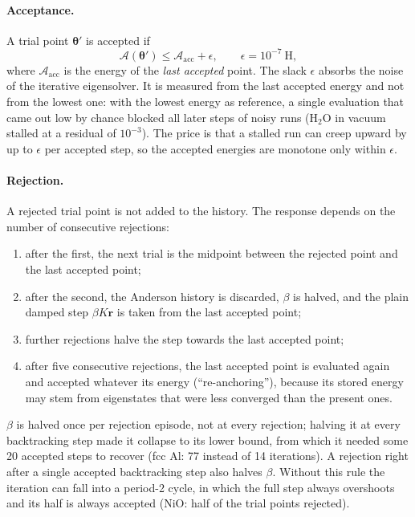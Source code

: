 \documentclass[11pt,a4paper,oneside]{book}
\newcommand{\vth}{\bm\theta}
\begin{document}
\paragraph{Acceptance.} A trial point $\vth'$ is accepted if
\begin{equation}
  \mathcal A(\vth')\le\mathcal A_{\mathrm{acc}}+\epsilon,
  \qquad \epsilon=10^{-7}~\mathrm H,
\end{equation}
where $\mathcal A_{\mathrm{acc}}$ is the energy of the \emph{last
accepted} point. The slack $\epsilon$ absorbs the noise of the iterative
eigensolver. It is measured from the last accepted energy and not from
the lowest one: with the lowest energy as reference, a single
evaluation that came out low by chance blocked all later steps of noisy
runs (H$_2$O in vacuum stalled at a residual of $10^{-3}$). The price is
that a stalled run can creep upward by up to $\epsilon$ per accepted
step, so the accepted energies are monotone only within $\epsilon$.

\paragraph{Rejection.} A rejected trial point is not added to the
history. The response depends on the number of consecutive rejections:
\begin{enumerate}
\item after the first, the next trial is the midpoint between the
  rejected point and the last accepted point;
\item after the second, the Anderson history is discarded, $\beta$ is
  halved, and the plain damped step $\beta K\bm r$ is taken from the last
  accepted point;
\item further rejections halve the step towards the last accepted
  point;
\item after five consecutive rejections, the last accepted point is
  evaluated again and accepted whatever its energy (``re-anchoring''),
  because its stored energy may stem from eigenstates that were less
  converged than the present ones.
\end{enumerate}
$\beta$ is halved once per rejection episode, not at every rejection;
halving it at every backtracking step made it collapse to its lower
bound, from which it needed some 20 accepted steps to recover (fcc Al:
77 instead of 14 iterations). A rejection right after a single accepted
backtracking step also halves $\beta$. Without this rule the iteration
can fall into a period-2 cycle, in which the full step always overshoots
and its half is always accepted (NiO: half of the trial points
rejected).
\end{document}
